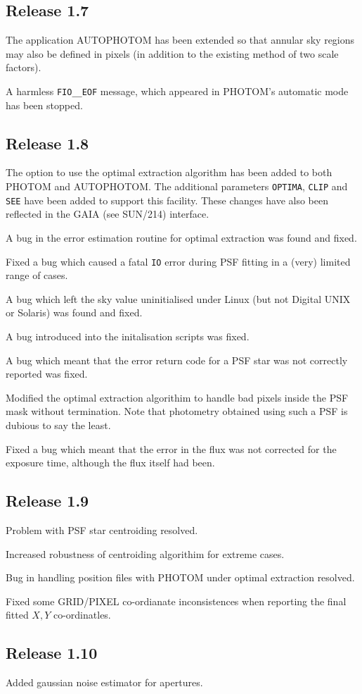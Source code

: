 \documentclass[twoside,11pt]{article}
\newcommand{\htmlref}[2]{#1}
\newcommand{\xref}[3]{#1}
\renewcommand{\_}{\texttt{\symbol{95}}}
\begin{document}
\subsection{Release 1.7}
The application \htmlref{AUTOPHOTOM}{AUTOPHOTOM} has been extended so
that annular sky regions may also be defined in pixels (in addition to
the existing method of two scale factors).

A harmless \verb+FIO__EOF+ message, which appeared in
\htmlref{PHOTOM's}{PHOTOM} automatic mode has been stopped.

\subsection{Release 1.8}
The option to use the optimal extraction algorithm has been added
to both \htmlref{PHOTOM}{PHOTOM} and \htmlref{AUTOPHOTOM}{AUTOPHOTOM}. 
The additional parameters \texttt{OPTIMA}, \texttt{CLIP} and \texttt{SEE} 
have been added to support this facility. These changes have also been 
reflected in the GAIA (see \xref{SUN/214}{sun214}{}) interface.

A bug in the error estimation routine for optimal extraction was found 
and fixed.

Fixed a bug which caused a fatal \verb+IO+ error during PSF fitting in a (very) 
limited range of cases.

A bug which left the sky value uninitialised under Linux (but not Digital UNIX or Solaris) was found and fixed.

A bug introduced into the initalisation scripts was fixed.

A bug which meant that the error return code for a PSF star was not correctly reported was fixed.

Modified the optimal extraction algorithim to handle bad pixels inside the PSF mask without termination. Note that photometry obtained using such a PSF is dubious to say the least.

Fixed a bug which meant that the error in the flux was not corrected for the exposure time, although the flux itself had been.

\subsection{Release 1.9}

Problem with PSF star centroiding resolved.

Increased robustness of centroiding algorithim for extreme cases.

Bug in handling position files with PHOTOM under optimal extraction resolved.

Fixed some GRID/PIXEL co-ordianate inconsistences when reporting the
final fitted $X,Y$ co-ordinatles.

\subsection{Release 1.10}

Added gaussian noise estimator for apertures.
\end{document}
